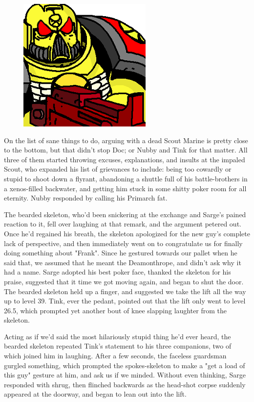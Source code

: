 \begin{figure}
	\begin{center}
		\includegraphics[width=\figwidth]{pics/15/60.png}
	\end{center}
\end{figure}
On the list of sane things to do, arguing with a dead Scout Marine is pretty close to the bottom, but that didn't stop Doc; 
or Nubby and Tink for that matter. 
All three of them started throwing excuses, explanations, and insults at the impaled Scout, who expanded his list of grievances to include: 
being too cowardly or stupid to shoot down a flyrant, abandoning a shuttle full of his battle-brothers in a xenos-filled backwater, and getting him stuck in some shitty poker room for all eternity. 
Nubby responded by calling his Primarch fat.

The bearded skeleton, who'd been snickering at the exchange and Sarge's pained reaction to it, fell over laughing at that remark, and the argument petered out. 
Once he'd regained his breath, the skeleton apologized for the new guy's complete lack of perspective, and then immediately went on to congratulate us for finally doing something about "Frank". 
Since he gestured towards our pallet when he said that, we assumed that he meant the Deamonthrope, and didn't ask why it had a name. 
Sarge adopted his best poker face, thanked the skeleton for his praise, suggested that it time we got moving again, and began to shut the door. 
The bearded skeleton held up a finger, and suggested we take the lift all the way up to level 39. 
Tink, ever the pedant, pointed out that the lift only went to level 26.5, which prompted yet another bout of knee slapping laughter from the skeleton.

Acting as if we'd said the most hilariously stupid thing he'd ever heard, the bearded skeleton repeated Tink's statement to his three companions, two of which joined him in laughing. 
After a few seconds, the faceless guardsman gurgled something, which prompted the spokes-skeleton to make a "get a load of this guy" gesture at him, and ask us if we minded. 
Without even thinking, Sarge responded with shrug, then flinched backwards as the head-shot corpse suddenly appeared at the doorway, and began to lean out into the lift.

